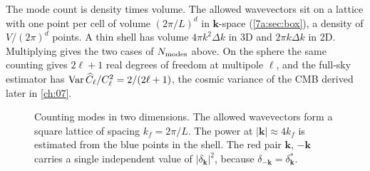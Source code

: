 The mode count is density times volume. The allowed wavevectors sit on a lattice
with one point per cell of volume $(2\pi/L)^d$ in $\bm k$-space
(\cref{7a:sec:box}), a density of $V/(2\pi)^d$ points. A thin shell has volume
$4\pi k^2\Delta k$ in 3D and $2\pi k\Delta k$ in 2D. Multiplying gives the two
cases of $N_{\rm modes}$ above. On the sphere
the same counting gives $2\ell+1$ real degrees of freedom at multipole $\ell$, and
the full-sky estimator has $\operatorname{Var}\widehat{C}_\ell/C_\ell^2=2/(2\ell+1)$, the cosmic variance of
the CMB derived later in \cref{ch:07}.

\begin{figure}[htbp]
\centering
{}
\caption{Counting modes in two dimensions. The allowed wavevectors form a square
lattice of spacing $k_f=2\pi/L$. The power at $|\bm k|\approx4k_f$ is estimated
from the blue points in the shell. The red pair $\bm k$, $-\bm k$ carries a single
independent value of $|\delta_{\bm k}|^2$, because $\delta_{-\bm k}=\delta_{\bm k}^*$.}
\label{7a:fig:kshell}
\end{figure}

